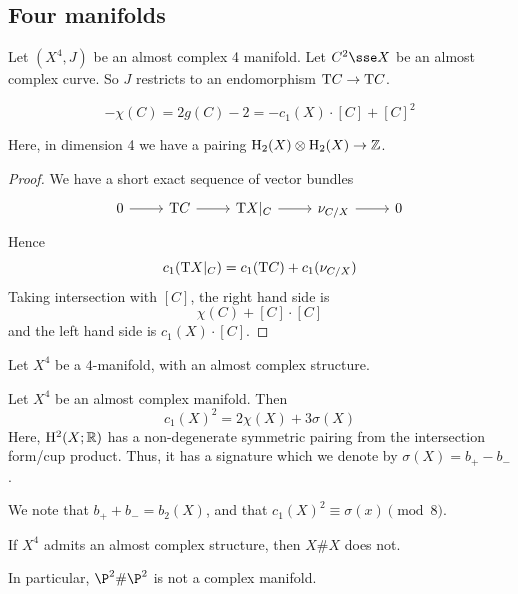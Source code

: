 \documentclass{article}
\begin{document}
\subsection{Four manifolds}

Let \((X^4, J)\) be an almost complex 4 manifold. Let \(C^2 \sse X\) be an almost complex curve. So \(J\) restricts to an endomorphism \(\mathrm{T} C \to \mathrm{T} C\).

\begin{proposition}
    \[-\chi(C) = 2g(C) -2 = -c_1(X)\cdot [C] + [C]^2\]
\end{proposition}

Here, in dimension 4 we have a pairing \(\mathrm{H}_2(X) \otimes \mathrm{H}_2(X) \to \mathbb{Z}\).

\begin{proof}
    We have a short exact sequence of vector bundles
    \[\begin{tikzcd}
        0 & {\T C} & {\T X\vert_C} & {\nu_{C/X}} & 0
        \arrow[from=1-1, to=1-2]
        \arrow[from=1-2, to=1-3]
        \arrow[from=1-3, to=1-4]
        \arrow[from=1-4, to=1-5]
    \end{tikzcd}\]
    Hence
    \[c_1(\mathrm{T} X\vert_C) = c_1(\mathrm{T} C) + c_1(\nu_{C/X})\]
    Taking intersection with \([C]\), the right hand side is
    \[\chi(C) + [C]\cdot [C]\]
    and the left hand side is \(c_1(X) \cdot [C]\).
\end{proof}

\lec

Let \(X^4\) be a \(4\)-manifold, with an almost complex structure.

\begin{theorem}
     Let \(X^4\) be an almost complex manifold. Then
    \[c_1(X)^2 = 2\chi(X) + 3\sigma(X)\]
    Here, \(\mathrm{H}^2(X; \mathbb{R})\) has a non-degenerate symmetric pairing from the intersection form/cup product. Thus, it has a signature which we denote by \(\sigma(X) = b_+ - b_-\).
\end{theorem}

We note that \(b_+ + b_- = b_2(X)\), and that \(c_1(X)^2 \equiv \sigma(x) \pmod 8\).

\begin{proposition}
    If \(X^4\) admits an almost complex structure, then \(X \# X\) does not.
\end{proposition}

In particular, \(\P^2 \# \P^2\) is not a complex manifold.
\end{document}
